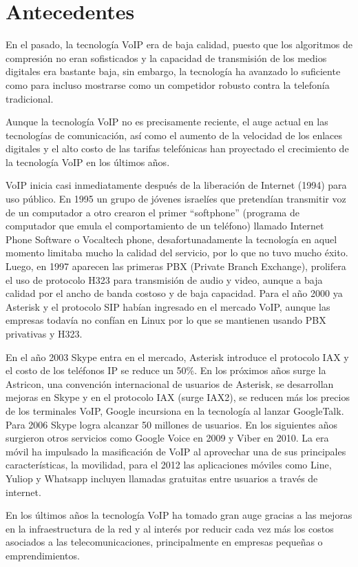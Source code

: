 \section{Antecedentes}
	
	En el pasado, la tecnología VoIP era de baja calidad, puesto que los algoritmos 
	de compresión no eran sofisticados y la capacidad de transmisión de los medios 
	digitales era bastante baja, sin embargo, la tecnología ha avanzado lo suficiente 
	como para incluso mostrarse como un competidor robusto contra la telefonía tradicional.
	 
	Aunque la tecnología VoIP no es precisamente reciente, el auge actual en las tecnologías 
	de comunicación, así como el aumento de la velocidad de los enlaces digitales y el alto 
	costo de las tarifas telefónicas han proyectado el crecimiento de la tecnología VoIP en los últimos años.
	
	VoIP inicia casi inmediatamente después de la liberación de Internet (1994) para uso público.
	En 1995 un grupo de jóvenes israelíes que pretendían transmitir voz de un computador a 
	otro crearon el primer “softphone” (programa de computador que emula el comportamiento 
	de un teléfono) llamado Internet Phone Software o Vocaltech phone, desafortunadamente 
	la tecnología en aquel momento limitaba mucho la calidad del servicio, por lo que no 
	tuvo mucho éxito. Luego, en 1997 aparecen las primeras PBX (Private Branch Exchange), 
	prolifera el uso de protocolo H323 para transmisión de audio y video, aunque a baja 
	calidad por el ancho de banda costoso y de baja capacidad. Para el año 2000 ya Asterisk 
	y el protocolo SIP habían ingresado en el mercado VoIP, aunque las empresas todavía no 
	confían en Linux por lo que se mantienen usando PBX privativas y H323. 
	
	En el año 2003 Skype entra en el mercado, Asterisk introduce el protocolo IAX y el 
	costo de los teléfonos IP se reduce un 50\%. En los próximos años surge la Astricon, 
	una convención internacional de usuarios de Asterisk, se desarrollan mejoras en Skype 
	y en el protocolo IAX (surge IAX2), se reducen más los precios de los terminales VoIP, 
	Google incursiona en la tecnología al lanzar GoogleTalk. Para 2006 Skype logra alcanzar 
	50 millones de usuarios. En los siguientes años surgieron otros servicios como Google 
	Voice en 2009 y Viber en 2010. La era móvil ha impulsado la masificación de VoIP al 
	aprovechar una de sus principales características, la movilidad, para el 2012 las 
	aplicaciones móviles como Line, Yuliop y Whatsapp incluyen llamadas gratuitas entre 
	usuarios a través de internet. 
	
	En los últimos años la tecnología VoIP ha tomado gran auge gracias a las mejoras 
	en la infraestructura de la red y al interés por reducir cada vez más los costos 
	asociados a las telecomunicaciones, principalmente en empresas pequeñas o 
	emprendimientos.